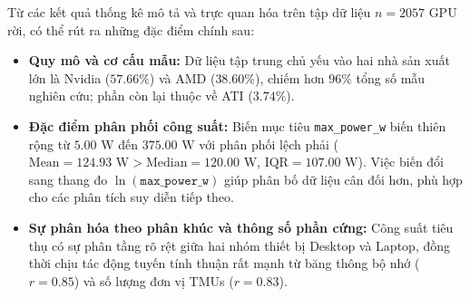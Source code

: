 Từ các kết quả thống kê mô tả và trực quan hóa trên tập dữ liệu $n = 2057$ GPU rời, có thể rút ra những đặc điểm chính sau:
\begin{itemize}\tightlist
    \item \textbf{Quy mô và cơ cấu mẫu:} Dữ liệu tập trung chủ yếu vào hai nhà sản xuất lớn là Nvidia ($57.66\%$) và AMD ($38.60\%$), chiếm hơn $96\%$ tổng số mẫu nghiên cứu; phần còn lại thuộc về ATI ($3.74\%$).
    \item \textbf{Đặc điểm phân phối công suất:} Biến mục tiêu \texttt{max\_power\_w} biến thiên rộng từ $5.00\text{ W}$ đến $375.00\text{ W}$ với phân phối lệch phải ($\text{Mean} = 124.93\text{ W} > \text{Median} = 120.00\text{ W}$, $\text{IQR} = 107.00\text{ W}$). Việc biến đổi sang thang đo $\ln(\texttt{max\_power\_w})$ giúp phân bố dữ liệu cân đối hơn, phù hợp cho các phân tích suy diễn tiếp theo.
    \item \textbf{Sự phân hóa theo phân khúc và thông số phần cứng:} Công suất tiêu thụ có sự phân tầng rõ rệt giữa hai nhóm thiết bị Desktop và Laptop, đồng thời chịu tác động tuyến tính thuận rất mạnh từ băng thông bộ nhớ ($r = 0.85$) và số lượng đơn vị TMUs ($r = 0.83$).
\end{itemize}
